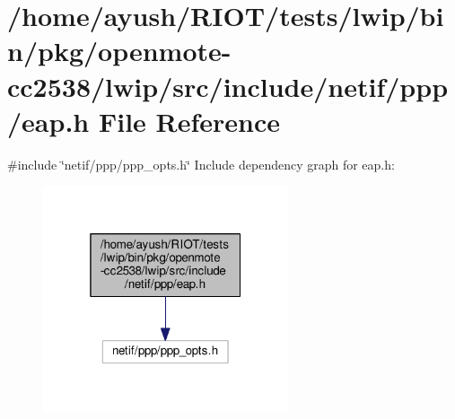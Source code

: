 \hypertarget{openmote-cc2538_2lwip_2src_2include_2netif_2ppp_2eap_8h}{}\section{/home/ayush/\+R\+I\+O\+T/tests/lwip/bin/pkg/openmote-\/cc2538/lwip/src/include/netif/ppp/eap.h File Reference}
\label{openmote-cc2538_2lwip_2src_2include_2netif_2ppp_2eap_8h}
{\ttfamily \#include \char`\"{}netif/ppp/ppp\+\_\+opts.\+h\char`\"{}}\newline
Include dependency graph for eap.\+h\+:
\nopagebreak
\begin{figure}[H]
\begin{center}
\leavevmode
\includegraphics[width=205pt]{openmote-cc2538_2lwip_2src_2include_2netif_2ppp_2eap_8h__incl}
\end{center}
\end{figure}
